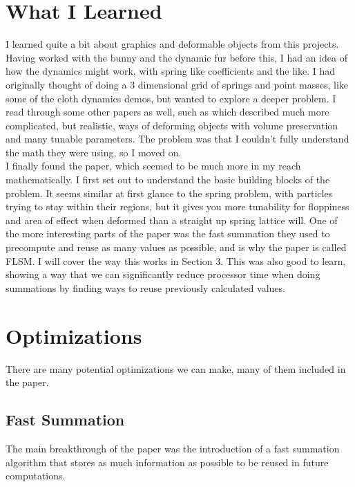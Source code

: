 \documentclass[12pt,a4paper]{amsart}
\begin{document}
	\section{What I Learned}
	I learned quite a bit about graphics and deformable objects from this projects. Having worked with the bunny and the dynamic fur before this, I had an idea of how the dynamics might work, with spring like coefficients and the like. I had originally thought of doing a 3 dimensional grid of springs and point masses, like some of the cloth dynamics demos, but wanted to explore a deeper problem. I read through some other papers as well, such as \cite{JamesDoug1999Aart} which described much more complicated, but realistic, ways of deforming objects with volume preservation and many tunable parameters. The problem was that I couldn't fully understand the math they were using, so I moved on. \\
	\indent I finally found the \cite{rivers} paper, which seemed to be much more in my reach mathematically. I first set out to understand the basic building blocks of the problem. It seems similar at first glance to the spring problem, with particles trying to stay within their regions, but it gives you more tunability for floppiness and area of effect when deformed than a straight up spring lattice will.
	\indent One of the more interesting parts of the paper was the fast summation they used to precompute and reuse as many values as possible, and is why the paper is called FLSM. I will cover the way this works in Section 3. This was also good to learn, showing a way that we can significantly reduce processor time when doing summations by finding ways to reuse previously calculated values.
	
	\section{Optimizations}
	There are many potential optimizations we can make, many of them included in the \cite{rivers} paper.
	
	\subsection{Fast Summation}
	The main breakthrough of the paper was the introduction of a fast summation algorithm that stores as much information as possible to be reused in future computations.
	
\end{document}
